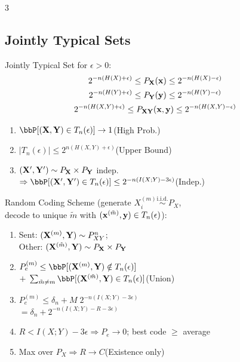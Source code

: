 \documentclass[12pt, a4paper]{article}
\begin{document}
\begin{multicols*}{3}
\colbreak
\subsection{Jointly Typical Sets}
Jointly Typical Set for $\epsilon>0$:
\begin{gather*}
  2^{-n(H(X) + \epsilon)} \leq P_{\mathbf{X}}(\mathbf{x}) \leq 2^{-n(H(X)-\epsilon)}\\
  2^{-n(H(Y) + \epsilon)} \leq P_{\mathbf{Y}}(\mathbf{y}) \leq 2^{-n(H(Y)-\epsilon)}\\
  2^{-n(H(X, Y) + \epsilon)} \leq P_{\mathbf{X}\mathbf{Y}}(\mathbf{x}, \mathbf{y}) \leq 2^{-n(H(X, Y)-\epsilon)}
\end{gather*}
\begin{enumerate}[\roman*.]
  \item $\Pr[(\bX,\bY)\in T_n(\epsilon)]\to 1$\hfill(High Prob.)
  \item $|T_n(\epsilon)|\le 2^{n(H(X,Y)+\epsilon)}$\hfill(Upper Bound)
  \item $(\mathbf{X}',\mathbf{Y}')\sim P_{\mathbf{X}}\times P_{\mathbf{Y}}$ indep.\\
    $\Rightarrow\Pr[(\bX',\bY')\in T_n(\epsilon)]\le 2^{-n(I(X;Y)-3\epsilon)}$\hfill(Indep.)
\end{enumerate}
 
Random Coding Scheme (generate $X_i^{(m)}\overset{\text{i.i.d.}}{\sim}P_X$,\\decode to unique $\tilde m$ with $(\mathbf{x}^{(\tilde m)},\mathbf{y})\in T_n(\epsilon)$):
\begin{enumerate}[\roman*.]
  \item Sent: $(\mathbf{X}^{(m)},\mathbf{Y})\sim P_{XY}^n$;\\Other: $(\mathbf{X}^{(\tilde m)},\mathbf{Y})\sim P_{\mathbf{X}}\times P_{\mathbf{Y}}$
  \item $P_e^{(m)}\le\Pr[(\bX^{(m)},\bY)\notin T_n(\epsilon)]$\\\hspace{3.5em}$+\;\sum_{\tilde m\neq m}\Pr[(\bX^{(\tilde m)},\bY)\in T_n(\epsilon)]$\hfill(Union)
  \item $P_e^{(m)}\le\delta_n+M\;2^{-n(I(X;Y)-3\epsilon)}$\\\hspace{2.5em}$=\delta_n+2^{-n(I(X;Y)-R-3\epsilon)}$
  \item $R<I(X;Y)-3\epsilon\Rightarrow P_e\to 0$; best code $\ge$ average
  \item Max over $P_X\Rightarrow R\to C$\hfill(Existence only)
\end{enumerate}
 

\end{multicols*}
\end{document}
